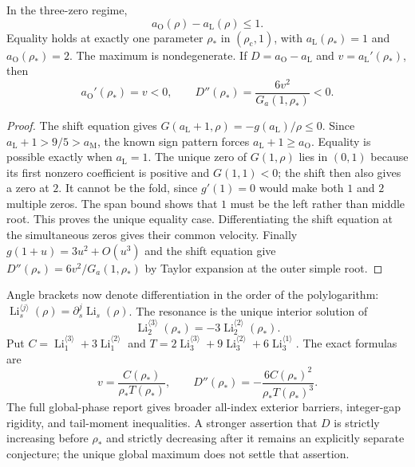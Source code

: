 \begin{theorem}\label{globalphase:span}
In the three-zero regime,
\[
 a_{\mathrm O}(\rho)-a_{\mathrm L}(\rho)\leq1.
\]
Equality holds at exactly one parameter $\rho_*$ in
$(\rho_{\mathrm c},1)$, with
$a_{\mathrm L}(\rho_*)=1$ and $a_{\mathrm O}(\rho_*)=2$.
The maximum is nondegenerate. If $D=a_{\mathrm O}-a_{\mathrm L}$ and
$v=a_{\mathrm L}'(\rho_*)$, then
\[
 a_{\mathrm O}'(\rho_*)=v<0,\qquad
 D''(\rho_*)=\frac{6v^2}{G_a(1,\rho_*)}<0.
\]
\end{theorem}
\begin{proof}
The shift equation gives
$G(a_{\mathrm L}+1,\rho)=-g(a_{\mathrm L})/\rho\leq0$.
Since $a_{\mathrm L}+1>9/5>a_{\mathrm M}$, the known sign pattern forces
$a_{\mathrm L}+1\geq a_{\mathrm O}$. Equality is possible exactly when
$a_{\mathrm L}=1$. The unique zero of $G(1,\rho)$ lies in $(0,1)$ because
its first nonzero coefficient is positive and $G(1,1)<0$; the shift then
also gives a zero at $2$. It cannot be the fold, since $g'(1)=0$ would make
both $1$ and $2$ multiple zeros. The span bound shows that $1$ must be the
left rather than middle root. This proves the unique equality case.
Differentiating the shift equation at the simultaneous zeros gives their
common velocity. Finally $g(1+u)=3u^2+O(u^3)$ and the shift equation give
$D''(\rho_*)=6v^2/G_a(1,\rho_*)$ by Taylor expansion at the outer simple root.
\end{proof}

Angle brackets now denote differentiation in the order of the polylogarithm:
$\operatorname{Li}_s^{\langle j\rangle}(\rho)=\partial_s^j
\operatorname{Li}_s(\rho)$. The resonance is the unique interior solution of
\[
 \operatorname{Li}_2^{\langle3\rangle}(\rho_*)
       =-3\operatorname{Li}_2^{\langle2\rangle}(\rho_*).
\]
Put $C=\operatorname{Li}_1^{\langle3\rangle}
+3\operatorname{Li}_1^{\langle2\rangle}$ and
$T=2\operatorname{Li}_3^{\langle3\rangle}
+9\operatorname{Li}_3^{\langle2\rangle}
+6\operatorname{Li}_3^{\langle1\rangle}$. The exact formulas are
\[
 v=\frac{C(\rho_*)}{\rho_*T(\rho_*)},\qquad
 D''(\rho_*)=-\frac{6C(\rho_*)^2}{\rho_*T(\rho_*)^3}.
\]
The full global-phase report gives broader all-index exterior barriers, integer-gap
rigidity, and tail-moment inequalities. A stronger assertion that $D$ is
strictly increasing before $\rho_*$ and strictly decreasing after it remains
an explicitly separate conjecture; the unique global maximum does not
settle that assertion.
